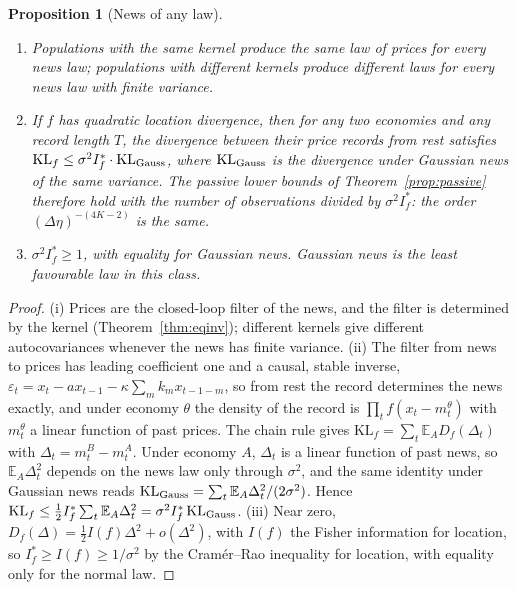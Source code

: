 \documentclass[12pt]{article}
\newtheorem{proposition}[theorem]{Proposition}
\theoremstyle{definition}
\theoremstyle{remark}
\begin{document}
\begin{proposition}[News of any law]\label{prop:nongauss}
\begin{enumerate}[label=(\roman*),itemsep=1pt]
\item Populations with the same kernel produce the same law of prices for every news law; populations with different kernels produce different laws for every news law with finite variance.
\item If $f$ has quadratic location divergence, then for any two economies and any record length $T$, the divergence between their price records from rest satisfies $\mathrm{KL}_f\le\sigma^2I^*_f\cdot\mathrm{KL}_{\rm Gauss}$, where $\mathrm{KL}_{\rm Gauss}$ is the divergence under Gaussian news of the same variance. The passive lower bounds of Theorem~\ref{prop:passive} therefore hold with the number of observations divided by $\sigma^2I^*_f$: the order $(\Delta\eta)^{-(4K-2)}$ is the same.
\item $\sigma^2I^*_f\ge1$, with equality for Gaussian news. Gaussian news is the least favourable law in this class.
\end{enumerate}
\end{proposition}

\begin{proof}
(i) Prices are the closed-loop filter of the news, and the filter is determined by the kernel (Theorem~\ref{thm:eqinv}); different kernels give different autocovariances whenever the news has finite variance.
(ii) The filter from news to prices has leading coefficient one and a causal, stable inverse, $\varepsilon_t=x_t-ax_{t-1}-\kappa\sum_mk_mx_{t-1-m}$, so from rest the record determines the news exactly, and under economy $\theta$ the density of the record is $\prod_tf(x_t-m^\theta_t)$ with $m^\theta_t$ a linear function of past prices. The chain rule gives $\mathrm{KL}_f=\sum_t\mathbb E_A D_f(\Delta_t)$ with $\Delta_t=m^B_t-m^A_t$. Under economy $A$, $\Delta_t$ is a linear function of past news, so $\mathbb E_A\Delta_t^2$ depends on the news law only through $\sigma^2$, and the same identity under Gaussian news reads $\mathrm{KL}_{\rm Gauss}=\sum_t\mathbb E_A\Delta_t^2/(2\sigma^2)$. Hence $\mathrm{KL}_f\le\frac12I^*_f\sum_t\mathbb E_A\Delta_t^2=\sigma^2I^*_f\,\mathrm{KL}_{\rm Gauss}$.
(iii) Near zero, $D_f(\Delta)=\frac12I(f)\Delta^2+o(\Delta^2)$, with $I(f)$ the Fisher information for location, so $I^*_f\ge I(f)\ge1/\sigma^2$ by the Cram\'er--Rao inequality for location, with equality only for the normal law.
\end{proof}
\end{document}
